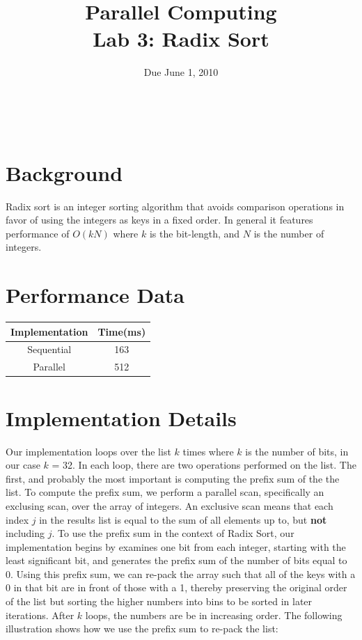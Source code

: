 \documentclass[12pt]{article}
\title{ Parallel Computing \\ Lab 3: Radix Sort }
\author{\MyFullName}
\date{ Due June 1, 2010 }
\renewcommand{\indent}{\hspace{0.25in}}
\begin{document}
\maketitle
\thispagestyle{empty}
\begin{center}
\end{center}
\setcounter{page}{0}
\newpage

\def\thesection{\Roman{section}.}
\hfill \\
\section{ Background }

\indent Radix sort is an integer sorting algorithm that avoids comparison operations in favor of using the integers as keys in a fixed order. In general it features performance of $O(k N)$ where $k$ is the bit-length, and $N$ is the number of integers.

\section{ Performance Data }
\begin{center}
\begin{tabular}{ c| c }

Implementation & Time(ms) \\ \hline
Sequential & 163 \\ 
Parallel & 512 \\ 
\end{tabular}
\end{center}

\section{ Implementation Details }
\indent  Our implementation loops over the list $k$ times where $k$ is the number of bits, in our case $k$ = 32.   In each loop, there are two operations performed on the list.  The first, and probably the most important is computing the prefix sum of the the list.  To compute the prefix sum, we perform a parallel scan, specifically an exclusing scan, over the array of integers. An exclusive scan means that each index $j$ in the results list is equal to the sum of all elements up to, but \textbf{not} including $j$.  To use the prefix sum in the context of Radix Sort, our implementation begins by examines one bit from each integer, starting with the least significant bit, and generates the prefix sum of the number of bits equal to 0.  Using this prefix sum, we can re-pack the array such that all of the keys with a 0 in that bit are in front of those with a 1, thereby preserving the original order of the list but sorting the higher numbers into bins to be sorted in later iterations.  After $k$ loops, the numbers are be in increasing order. The following illustration shows how we use the prefix sum to re-pack the list: \\
\end{document}
